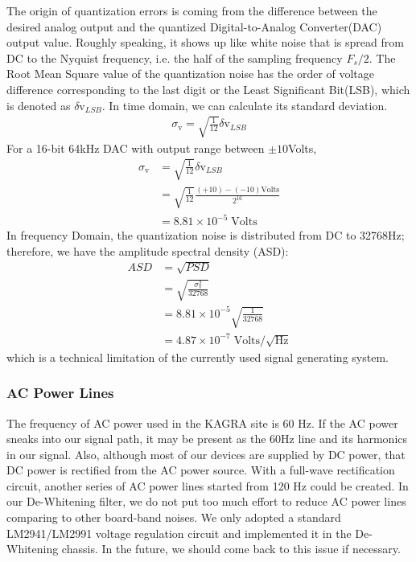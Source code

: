 The origin of quantization errors is coming from the difference between the desired analog output and the quantized Digital-to-Analog Converter(DAC) output value. Roughly speaking, it shows up like white noise that is spread from DC to the Nyquist frequency, i.e. the half of the sampling frequency $F_s/2$.
The Root Mean Square value of the quantization noise has the order of voltage difference corresponding to the last digit or the Least Significant Bit(LSB), which is denoted as $\delta \mathrm{v}_{LSB}$. In time domain, we can calculate its standard deviation.
\begin{align}
   \sigma_\mathrm{v} = \sqrt{\frac{1}{12}} \delta \mathrm{v}_{LSB}
\end{align}
For a 16-bit 64kHz DAC with output range between $\pm 10$Volts, 
\begin{align}
    \sigma_\mathrm{v} &= \sqrt{\frac{1}{12}} \delta \mathrm{v}_{LSB} \\
             &= \sqrt{\frac{1}{12}} \frac{(+10)-(-10) \mathrm{Volts}}{2^{16}} \\
             &= 8.81 \times 10^{-5} \;\mathrm{Volts}
\end{align}
In frequency Domain, the quantization noise is distributed from DC to 32768Hz; therefore, we have the amplitude spectral density (ASD):
\begin{align}
    ASD &= \sqrt{PSD} \\
        &= \sqrt{ \frac{\sigma_\mathrm{v}^2}{32768} } \\
        &= 8.81 \times 10^{-5} \sqrt{\frac{1}{32768}} \\
        &= 4.87 \times 10^{-7} \;\mathrm{Volts}/\sqrt{\mathrm{Hz}} 
\end{align}
which is a technical limitation of the currently used signal generating system.



\subsubsection{AC Power Lines}
The frequency of AC power used in the KAGRA site is 60 Hz. If the AC power sneaks into our signal path, it may be present as the 60Hz line and its harmonics in our signal. Also, although most of our devices are supplied by DC power, that DC power is rectified from the AC power source. With a full-wave rectification circuit, another series of AC power lines started from 120 Hz could be created. In our De-Whitening filter, we do not put too much effort to reduce AC power lines comparing to other board-band noises. We only adopted a standard LM2941/LM2991 voltage regulation circuit and implemented it in the De-Whitening chassis. In the future, we should come back to this issue if necessary.


